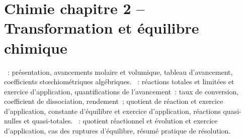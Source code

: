 \documentclass[a4paper, 12pt, final, garamond]{book}
\begin{document}
\section*{Chimie chapitre 2 -- Transformation et équilibre chimique}
\begin{enumerate}[label=\Roman*]
	~: présentation, avancements molaire
	et volumique, tableau d'avancement, coefficients stœchiométriques
	algébriques.
	~: réactions
	totales et limitées et exercice d'application, quantifications de
	l'avancement~: taux de conversion, coefficient de dissociation,
	rendement~; quotient de réaction et exercice d'application, constante
	d'équilibre et exercice d'application, réactions quasi-nulles et
	quasi-totales.
	~: quotient réactionnel et
	évolution et exercice d'application, cas des ruptures d'équilibre,
	résumé pratique de résolution.
\end{enumerate}
\end{document}
